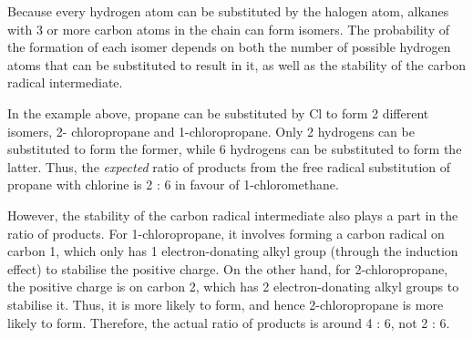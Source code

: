 			Because every hydrogen atom can be substituted by the halogen atom, alkanes with 3 or more carbon atoms in the chain
			can form isomers. The probability of the formation of each isomer depends on both the number of possible hydrogen atoms
			that can be substituted to result in it, as well as the stability of the carbon radical intermediate.





			In the example above, propane can be substituted by Cl to form 2 different isomers, 2- chloropropane and 1-chloropropane.
			Only 2 hydrogens can be substituted to form the former, while 6 hydrogens can be substituted to form the latter. Thus, the
			\textit{expected} ratio of products from the free radical substitution of propane with chlorine is 2 : 6 in
			favour of 1-chloromethane.

			However, the stability of the carbon radical intermediate also plays a part in the ratio of products. For 1-chloropropane,
			it involves forming a carbon radical on carbon 1, which only has 1 electron-donating alkyl group (through the induction effect)
			to stabilise the positive charge. On the other hand, for 2-chloropropane, the positive charge is on carbon 2, which
			has 2 electron-donating alkyl groups to stabilise it. Thus, it is more likely to form, and hence 2-chloropropane is more
			likely to form.	Therefore, the actual ratio of products is around 4 : 6, not 2 : 6.

